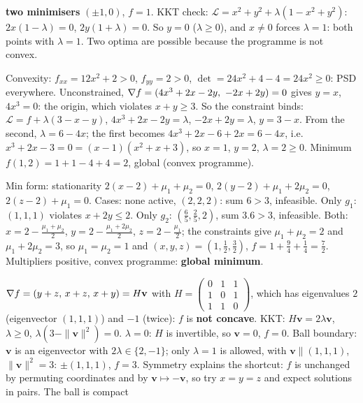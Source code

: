 \begin{solutions}
        \textbf{two minimisers} $(\pm1,0)$, $f=1$. KKT check:
        $\mathcal{L}=x^{2}+y^{2}+\lambda(1-x^{2}+y^{2})$: $2x(1-\lambda)=0$,
        $2y(1+\lambda)=0$. So $y=0$ ($\lambda\ge0$), and $x\neq0$ forces
        $\lambda=1$: both points with $\lambda=1$. Two optima are possible
        because the programme is not convex.
  \item Convexity: $f_{xx}=12x^{2}+2>0$, $f_{yy}=2>0$,
        $\det=24x^{2}+4-4=24x^{2}\ge0$: PSD everywhere. Unconstrained,
        $\nabla f=(4x^{3}+2x-2y,\ -2x+2y)=0$ gives $y=x$, $4x^{3}=0$: the
        origin, which violates $x+y\ge3$. So the constraint binds:
        $\mathcal{L}=f+\lambda(3-x-y)$, $4x^{3}+2x-2y=\lambda$,
        $-2x+2y=\lambda$, $y=3-x$. From the second, $\lambda=6-4x$; the
        first becomes $4x^{3}+2x-6+2x=6-4x$, i.e.\ $x^{3}+2x-3=0
        =(x-1)(x^{2}+x+3)$, so $x=1$, $y=2$, $\lambda=2\ge0$. Minimum
        $f(1,2)=1+1-4+4=2$, global (convex programme).
  \item Min form: stationarity $2(x-2)+\mu_1+\mu_2=0$,
        $2(y-2)+\mu_1+2\mu_2=0$, $2(z-2)+\mu_1=0$. Cases: none active,
        $(2,2,2)$: sum $6>3$, infeasible. Only $g_1$: $(1,1,1)$ violates
        $x+2y\le2$. Only $g_2$: $(\tfrac65,\tfrac25,2)$, sum $3.6>3$,
        infeasible. Both: $x=2-\tfrac{\mu_1+\mu_2}2$,
        $y=2-\tfrac{\mu_1+2\mu_2}2$, $z=2-\tfrac{\mu_1}2$; the constraints
        give $\mu_1+\mu_2=2$ and $\mu_1+2\mu_2=3$, so $\mu_1=\mu_2=1$ and
        $(x,y,z)=(1,\tfrac12,\tfrac32)$, $f=1+\tfrac94+\tfrac14=\tfrac72$.
        Multipliers positive, convex programme: \textbf{global minimum}.
  \item $\nabla f=(y+z,\,x+z,\,x+y)=H\mathbf{v}$ with
        $H=\begin{pmatrix}0&1&1\\1&0&1\\1&1&0\end{pmatrix}$, which has
        eigenvalues $2$ (eigenvector $(1,1,1)$) and $-1$ (twice): $f$ is
        \textbf{not concave}. KKT: $H\mathbf{v}=2\lambda\mathbf{v}$,
        $\lambda\ge0$, $\lambda(3-\|\mathbf{v}\|^{2})=0$. $\lambda=0$: $H$ is
        invertible, so $\mathbf{v}=0$, $f=0$. Ball boundary: $\mathbf{v}$ is
        an eigenvector with $2\lambda\in\{2,-1\}$; only $\lambda=1$ is
        allowed, with $\mathbf{v}\parallel(1,1,1)$, $\|\mathbf{v}\|^{2}=3$:
        $\pm(1,1,1)$, $f=3$. Symmetry explains the shortcut: $f$ is
        unchanged by permuting coordinates and by $\mathbf{v}\mapsto-\mathbf{v}$,
        so try $x=y=z$ and expect solutions in pairs. The ball is compact

\end{solutions}

